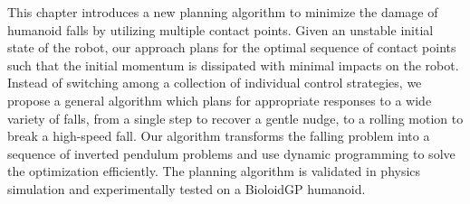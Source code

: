 This chapter introduces a new planning algorithm to minimize the damage
of humanoid falls by utilizing multiple contact points. Given an
unstable initial state of the robot, our approach plans for the
optimal sequence of contact points such that the initial momentum is
dissipated with minimal impacts on the robot. Instead of switching
among a collection of individual control strategies, we propose a
general algorithm which plans for appropriate responses to a wide
variety of falls, from a single step to recover a gentle nudge, to a
rolling motion to break a high-speed fall.  Our algorithm transforms
the falling problem into a sequence of inverted pendulum problems and
use dynamic programming to solve the optimization efficiently.  The
planning algorithm is validated in physics simulation and
experimentally tested on a BioloidGP humanoid.
